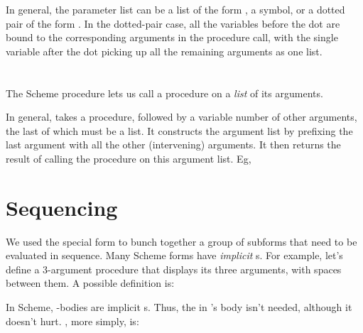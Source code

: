 In general, the  parameter list can be a list
of the form , a symbol, or a dotted pair of
the form .  In the dotted-pair case, all
the variables before the dot are bound to the
corresponding arguments in the procedure call, with the
single variable after the dot picking up all the
remaining arguments as one list.


\section{}

The Scheme procedure  lets us call a procedure
on a {\em list} of its arguments.


In general,  takes a procedure, followed by a
variable number of other arguments, the last of which
must be a list.  It constructs the argument list by
prefixing the last argument with all the other
(intervening) arguments.  It then returns the result of
calling the procedure
on this argument list.  Eg,



\section{Sequencing}

We used the  special form to bunch together a
group of subforms that need to be evaluated in
sequence.  Many Scheme forms have {\em implicit}
s.  For example, let's define a 3-argument procedure that
displays its three arguments, with spaces between
them.  A possible definition is:



In Scheme, -bodies are implicit s.
Thus, the  in 's body isn't needed, although it doesn't
hurt.  , more simply, is:

